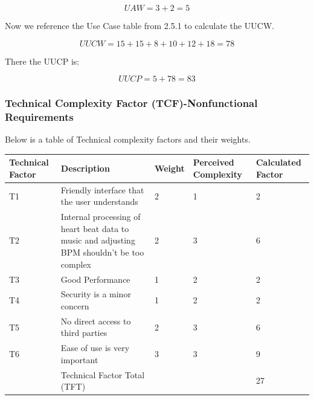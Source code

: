 \documentclass[letterpaper,english, 12pt]{scrreprt}
\begin{document}
\begin{equation}
UAW = 3 + 2 = 5
\end{equation}

Now we reference the Use Case table from 2.5.1 to calculate the UUCW.

\begin{equation}
UUCW = 15 + 15 + 8 + 10 + 12 + 18 = 78
\end{equation}

There the UUCP is:

\begin{equation}
UUCP = 5 + 78 = 83
\end{equation}

\subsubsection{Technical Complexity Factor (TCF)-Nonfunctional Requirements}

Below is a table of Technical complexity factors and their weights.

\begin{center}
        \begin{tabular}{|C{2cm}|C{5cm}|C{1.5cm}|C{2cm}|C{2cm}|}
                \hline
                        Technical Factor & Description & Weight & Perceived Complexity & Calculated Factor \\
                \hline
                        T1 & Friendly interface that the user understands & 2 & 1 & 2 \\
                \hline
                        T2 & Internal processing of heart beat data to music and adjusting BPM shouldn't be too complex & 2 & 3 & 6\\
                \hline
                        T3 & Good Performance & 1 & 2 & 2 \\
                \hline
                        T4 & Security is a minor concern & 1 & 2 & 2 \\
                \hline
                        T5 & No direct access to third parties & 2 & 3 & 6 \\
                \hline
                        T6 & Ease of use is very important & 3 & 3 & 9\\
                \hline   
                        & Technical Factor Total (TFT) & & & 27 \\
                \hline
        \end{tabular}
\end{center}
\end{document}
